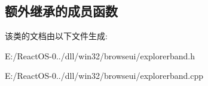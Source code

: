 \subsection*{额外继承的成员函数}


该类的文档由以下文件生成\+:\begin{DoxyCompactItemize}
\item 
E\+:/\+React\+O\+S-\/0../dll/win32/browseui/explorerband.\+h\item 
E\+:/\+React\+O\+S-\/0../dll/win32/browseui/explorerband.\+cpp\end{DoxyCompactItemize}
